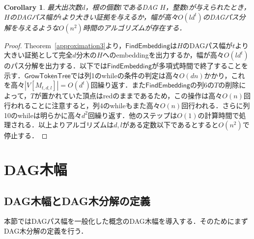 \documentclass[master]{kuisthesis}		%
\theoremstyle{plain}
\newtheorem{cor}{Corollary}
\theoremstyle{definition}
\begin{document}
\begin{cor}
    最大出次数$d$，根の個数$l$であるDAG $H$，整数$t$が与えられたとき，$H$のDAGパス幅が$t$より大きい証拠を与えるか，幅が高々$O(ld^t)$のDAGパス分解を与えるような$O(n^2)$時間のアルゴリズムが存在する．
\end{cor}

\begin{proof}
    Theorem~\ref{approximation3}より，$\mathsf{FindEmbedding}$は$H$のDAGパス幅が$t$より大きい証拠として完全$d$分木の$H$へのembeddingを出力するか，幅が高々$O(ld^t)$のパス分解を出力する．以下では$\mathsf{FindEmbedding}$が多項式時間で終了することを示す．$\mathsf{GrowTokenTree}$では列1のwhileの条件の判定は高々$O(dn)$かかり，これを高々$|V[M_{t, d, l}]| = O(d^t)$回繰り返す．また$\mathsf{FindEmbedding}$の列6の$T$の削除によって，$T$が置かれていた頂点はredのままであるため，この操作は高々$O(n)$回行われることに注意すると，列4のwhileもまた高々$O(n)$回行われる．さらに列10のwhileは明らかに高々$d^2$回繰り返す．他のステップは$O(1)$の計算時間で処理される．以上よりアルゴリズムは$d, l$がある定数以下であるとすると$O(n^2)$で停止する．
\end{proof}



















\section{DAG木幅} %

\subsection{DAG木幅とDAG木分解の定義}

本節ではDAGパス幅を一般化した概念のDAG木幅を導入する．そのためにまずDAG木分解の定義を行う．
\end{document}

